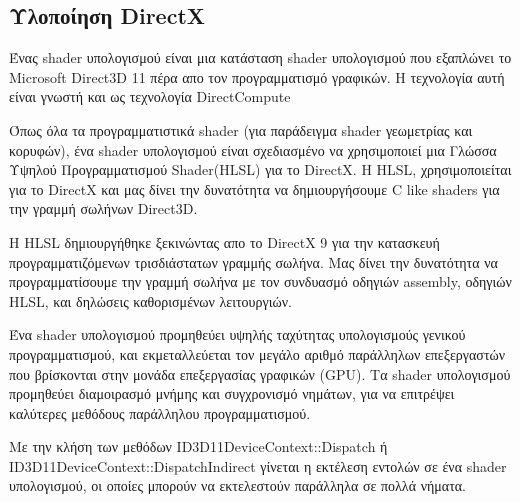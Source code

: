 \subsection{Υλοποίηση DirectX}
Ένας shader υπολογισμού είναι μια κατάσταση shader υπολογισμού που εξαπλώνει το Microsoft Direct3D 11 πέρα απο τον προγραμματισμό γραφικών. Η τεχνολογία αυτή είναι γνωστή και ως τεχνολογία DirectCompute\cite{computeshaders-2}

Όπως όλα τα προγραμματιστικά shader (για παράδειγμα shader γεωμετρίας και κορυφών), ένα shader υπολογισμού είναι σχεδιασμένο να χρησιμοποιεί μια Γλώσσα Υψηλού Προγραμματισμού Shader(HLSL) για το DirectX. Η HLSL, χρησιμοποιείται για το DirectX και μας δίνει την δυνατότητα να δημιουργήσουμε C like shaders για την γραμμή σωλήνων Direct3D. 

Η HLSL δημιουργήθηκε ξεκινώντας απο το DirectX 9 για την κατασκευή προγραμματιζόμενων τρισδιάστατων γραμμής σωλήνα. Μας δίνει την δυνατότητα να προγραμματίσουμε την γραμμή σωλήνα με τον συνδυασμό οδηγιών assembly, οδηγιών HLSL, και δηλώσεις καθορισμένων λειτουργιών.

Ένα shader υπολογισμού προμηθεύει υψηλής ταχύτητας υπολογισμούς γενικού προγραμματισμού, και εκμεταλλεύεται τον μεγάλο αριθμό παράλληλων επεξεργαστών που βρίσκονται στην μονάδα επεξεργασίας γραφικών (GPU). Τα shader υπολογισμού προμηθεύει διαμοιρασμό μνήμης και συγχρονισμό νημάτων, για να επιτρέψει καλύτερες μεθόδους παράλληλου προγραμματισμού. 

Με την κλήση των μεθόδων ID3D11DeviceContext::Dispatch ή ID3D11DeviceContext::DispatchIndirect γίνεται η εκτέλεση εντολών σε ένα shader υπολογισμού, οι οποίες μπορούν να εκτελεστούν παράλληλα σε πολλά νήματα.